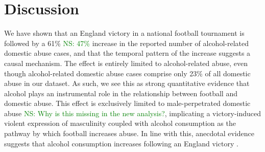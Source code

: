 \documentclass[12pt, a4paper]{article}
\newcommand{\NS}[1]{\textcolor{green}{NS: #1}}
\begin{document}



\clearpage

\section*{Discussion}

We have shown that an England victory in a national football tournament is followed by a 61\% \NS{47\%} increase in the reported number of alcohol-related domestic abuse cases, and that the temporal pattern of the increase suggests a causal mechanism. The effect is entirely limited to alcohol-related abuse, even though alcohol-related domestic abuse cases comprise only 23\% of all domestic abuse in our dataset. As such, we see this as strong quantitative evidence that alcohol plays an instrumental role in the relationship between football and domestic abuse. This effect is exclusively limited to male-perpetrated domestic abuse \NS{Why is this missing in the new analysis?}, implicating a victory-induced violent expression of masculinity coupled with alcohol consumption as the pathway by which football increases abuse. In line with this, anecdotal evidence suggests that alcohol consumption increases following an England victory \cite{Davies2018}. 
\end{document}
